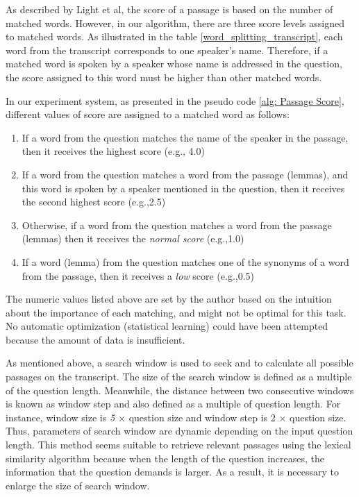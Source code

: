 As described by Light et al, the score of a passage is based on the number of matched words. However, in our algorithm, there are three score levels assigned to matched words. As illustrated in the table \ref{word_splitting_transcript}, each word from the transcript corresponds to one speaker's name. Therefore, if a matched word is spoken by a speaker whose name is addressed in the question, the score assigned to this word must be higher than other matched words. 

In our experiment system, as presented in the pseudo code \ref{alg: Passage Score}, different values of score are assigned to a matched word as follows: 
\begin{enumerate}
\item {If a word from the question matches the name of the speaker in the passage, then it receives the highest score (e.g., 4.0)}
\item {If a word from the question matches a word from the passage (lemmas), and this word is spoken by a speaker mentioned in the question, then it receives the second highest score (e.g.,2.5)}
\item{Otherwise, if a word from the question matches a word from the passage (lemmas) then it receives the \textit{normal score} (e.g.,1.0)}
\item{If a word (lemma) from the question matches one of the synonyms of a word from the passage, then it receives a \textit{low} score (e.g.,0.5)}
\end{enumerate}

The numeric values listed above are set by the author based on the intuition about the importance of each matching, and might not be optimal for this task. No automatic optimization (statistical learning) could have been attempted because the amount of data is insufficient.


As mentioned above, a search window is used to seek and to calculate all possible passages on the transcript. The size of the search window is defined as a multiple of the question length. Meanwhile, the distance between two consecutive windows is known as window step and also defined as a multiple of question length. For instance, window size is \textit{5 \ensuremath{\times}} question size and window step is {2 \ensuremath{\times}} question size. Thus, parameters of search window are dynamic depending on the input question length. This method seems suitable to retrieve relevant passages using the lexical similarity algorithm because when the length of the question increases, the information that the question demands is larger. As a result, it is necessary to enlarge the size of search window.

